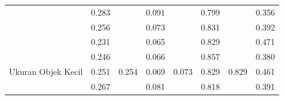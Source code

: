 \begin{table}[]
\begin{tabular}{|l|cc|cc|cc|c|}
                                                      & \multicolumn{1}{c|}{\cellcolor[HTML]{FFFFFF}0.283} & \cellcolor[HTML]{FFFFFF}                         & \multicolumn{1}{c|}{\cellcolor[HTML]{FFFFFF}0.091} & \cellcolor[HTML]{FFFFFF}                           & \multicolumn{1}{c|}{\cellcolor[HTML]{FFFFFF}0.799} & \cellcolor[HTML]{FFFFFF}                        & \multicolumn{1}{c|}{\cellcolor[HTML]{FFFFFF}0.356}   \\ \cline{2-2} \cline{4-4} \cline{6-6}
                                                      & \multicolumn{1}{c|}{\cellcolor[HTML]{FFFFFF}0.256} & \cellcolor[HTML]{FFFFFF}                         & \multicolumn{1}{c|}{\cellcolor[HTML]{FFFFFF}0.073} & \cellcolor[HTML]{FFFFFF}                           & \multicolumn{1}{c|}{\cellcolor[HTML]{FFFFFF}0.831} & \cellcolor[HTML]{FFFFFF}                        & \multicolumn{1}{c|}{\cellcolor[HTML]{FFFFFF}0.392}   \\ \cline{2-2} \cline{4-4} \cline{6-6}
                                                      & \multicolumn{1}{c|}{\cellcolor[HTML]{FFFFFF}0.231} & \cellcolor[HTML]{FFFFFF}                         & \multicolumn{1}{c|}{\cellcolor[HTML]{FFFFFF}0.065} & \cellcolor[HTML]{FFFFFF}                           & \multicolumn{1}{c|}{\cellcolor[HTML]{FFFFFF}0.829} & \cellcolor[HTML]{FFFFFF}                        & \multicolumn{1}{c|}{\cellcolor[HTML]{FFFFFF}0.471}   \\ \cline{2-2} \cline{4-4} \cline{6-6}
                                                      & \multicolumn{1}{c|}{\cellcolor[HTML]{FFFFFF}0.246} & \cellcolor[HTML]{FFFFFF}                         & \multicolumn{1}{c|}{\cellcolor[HTML]{FFFFFF}0.066} & \cellcolor[HTML]{FFFFFF}                           & \multicolumn{1}{c|}{\cellcolor[HTML]{FFFFFF}0.857} & \cellcolor[HTML]{FFFFFF}                        & \multicolumn{1}{c|}{\cellcolor[HTML]{FFFFFF}0.380}   \\ \cline{2-2} \cline{4-4} \cline{6-6}
  \multirow{-5}{*}{Ukuran Objek Kecil}                & \multicolumn{1}{c|}{\cellcolor[HTML]{FFFFFF}0.251} & \multirow{-5}{*}{\cellcolor[HTML]{FFFFFF}0.254}  & \multicolumn{1}{c|}{\cellcolor[HTML]{FFFFFF}0.069} & \multirow{-5}{*}{\cellcolor[HTML]{FFFFFF}0.073}    & \multicolumn{1}{c|}{\cellcolor[HTML]{FFFFFF}0.829} & \multirow{-5}{*}{\cellcolor[HTML]{FFFFFF}0.829} & \multicolumn{1}{c|}{\cellcolor[HTML]{FFFFFF}0.461}   \\ \hline
                                                      & \multicolumn{1}{c|}{\cellcolor[HTML]{FFFFFF}0.267} & \cellcolor[HTML]{FFFFFF}                         & \multicolumn{1}{c|}{\cellcolor[HTML]{FFFFFF}0.081} & \cellcolor[HTML]{FFFFFF}                           & \multicolumn{1}{c|}{\cellcolor[HTML]{FFFFFF}0.818} & \cellcolor[HTML]{FFFFFF}                        & \multicolumn{1}{c|}{\cellcolor[HTML]{FFFFFF}0.391}   \\ \cline{2-2} \cline{4-4} \cline{6-6}

\end{tabular}
\end{table}
